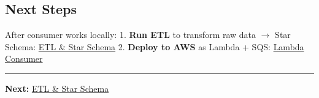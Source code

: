 \hypertarget{next-steps}{%
\subsection{Next Steps}}

After consumer works locally: 1. \textbf{Run ETL} to transform raw data
\(\rightarrow\) Star Schema: \href{5.7-ETL/}{ETL \& Star Schema} 2.
\textbf{Deploy to AWS} as Lambda + SQS:
\href{5.11-Lambda-Consumer/}{Lambda Consumer}

\begin{center}\rule{0.5\linewidth}{0.5pt}\end{center}

\textbf{Next:} \href{5.7-ETL/}{ETL \& Star Schema}
